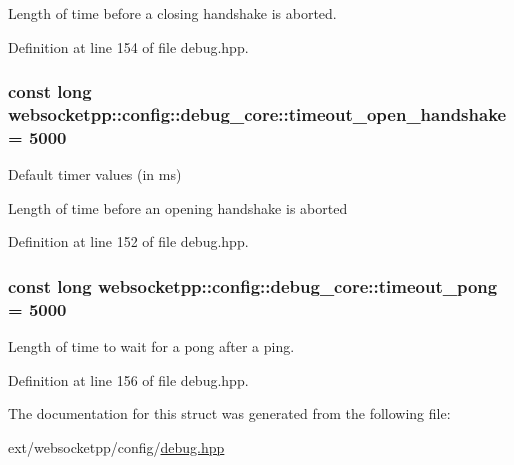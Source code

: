 Length of time before a closing handshake is aborted. 



Definition at line 154 of file debug.\+hpp.

\hypertarget{structwebsocketpp_1_1config_1_1debug__core_a99182b8a1b9b1d62075d414705165117}{}
\subsubsection[{timeout\+\_\+open\+\_\+handshake}]{\setlength{\rightskip}{0pt plus 5cm}const long websocketpp\+::config\+::debug\+\_\+core\+::timeout\+\_\+open\+\_\+handshake = 5000\hspace{0.3cm}{\ttfamily [static]}}\label{structwebsocketpp_1_1config_1_1debug__core_a99182b8a1b9b1d62075d414705165117}


Default timer values (in ms) 

Length of time before an opening handshake is aborted 

Definition at line 152 of file debug.\+hpp.

\hypertarget{structwebsocketpp_1_1config_1_1debug__core_a5d7acfccc65f4a8146b223d101ed1c7b}{}
\subsubsection[{timeout\+\_\+pong}]{\setlength{\rightskip}{0pt plus 5cm}const long websocketpp\+::config\+::debug\+\_\+core\+::timeout\+\_\+pong = 5000\hspace{0.3cm}{\ttfamily [static]}}\label{structwebsocketpp_1_1config_1_1debug__core_a5d7acfccc65f4a8146b223d101ed1c7b}


Length of time to wait for a pong after a ping. 



Definition at line 156 of file debug.\+hpp.



The documentation for this struct was generated from the following file\+:\begin{DoxyCompactItemize}
\item 
ext/websocketpp/config/\hyperlink{debug_8hpp}{debug.\+hpp}\end{DoxyCompactItemize}
